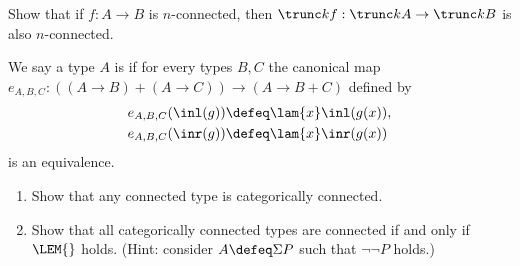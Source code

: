 \begin{ex}\label{ex:is-conn-trunc-functor}
  Show that if $f : A \to B$ is $n$-connected, then $\trunc kf : \trunc kA \to \trunc kB$ is also $n$-connected.
\end{ex}

\begin{ex}\label{ex:categorical-connectedness}
  We say a type $A$ is 
   if for every types $B, C$ the canonical map
  $e_{A, B, C}:((A\to B) + (A\to C)) \to (A \to B + C)$ defined by
  \begin{align*}
    e_{A,B,C}(\inl(g)) &\defeq \lam{x} \inl(g(x)),\\
    e_{A,B,C}(\inr(g)) &\defeq \lam{x} \inr(g(x))
  \end{align*}
  is an equivalence.
  \begin{enumerate}
  \item Show that any connected type is categorically connected.
  \item Show that all categorically connected types are connected if and only if $\LEM{}$ holds. (Hint: consider $A \defeq \Sigma P$ such that $\neg \neg P$ holds.)
  \end{enumerate}
\end{ex}

